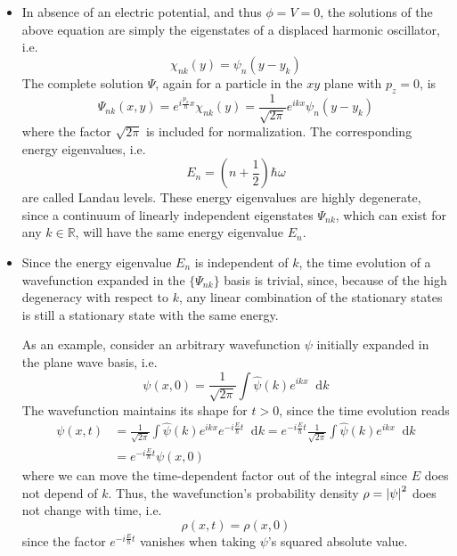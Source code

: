 \documentclass[11pt, a4paper]{article}
\newcommand{\diff}{\mathop{}\!\mathrm{d}} %
\newcommand{\F}[1]{\widehat{#1}} %
\newcommand{\p}{\psi}  %
\renewcommand{\P}{\Psi}  %
\begin{document}
\begin{itemize}
	\item In absence of an electric potential, and thus $ \phi = V = 0 $, the solutions of the above equation are simply the eigenstates of a displaced harmonic oscillator, i.e.
	\begin{equation*}
		\chi_{nk}(y) = \psi_{n}(y - y_{k})
	\end{equation*}
	The complete solution $ \Psi $, again for a particle in the $ xy $ plane with $ p_{z} = 0$, is
	\begin{equation*}
		\P_{nk}(x, y) = e^{i\frac{p_{x}}{\hbar}x}\chi_{nk}(y) = \frac{1}{\sqrt{2\pi}}e^{ikx} \psi_{n}(y - y_{k})
	\end{equation*}
	where the factor $ \sqrt{2\pi} $ is included for normalization. The corresponding energy eigenvalues, i.e.
	\begin{equation*}
		E_{n} = \left(n + \frac{1}{2}\right)\hbar \omega
	\end{equation*}
	are called Landau levels. These energy eigenvalues are highly degenerate, since a continuum of linearly independent eigenstates $ \P_{nk} $, which can exist for any $ k \in \mathbb{R} $, will have the same energy eigenvalue $ E_{n} $. 
	
	\item Since the energy eigenvalue $ E_{n} $ is independent of $ k $, the time evolution of a wavefunction expanded in the $ \{\P_{nk}\} $ basis is trivial, since, because of the high degeneracy with respect to $ k $, any linear combination of the stationary states is still a stationary state with the same energy.
	
	As an example, consider an arbitrary wavefunction $ \p $ initially expanded in the plane wave basis, i.e.
	\begin{equation*}
		\p(x, 0) = \frac{1}{\sqrt{2\pi}} \int \F{\p}(k)e^{ikx}\diff k
	\end{equation*}
	The wavefunction maintains its shape for $ t > 0 $, since the time evolution reads
	\begin{align*}
		\p(x, t) &= \frac{1}{\sqrt{2\pi}} \int \F{\p}(k)e^{ikx}e^{-i\frac{E}{\hbar}t} \diff k = e^{-i\frac{E}{\hbar}t} \frac{1}{\sqrt{2\pi}} \int \F{\p}(k)e^{ikx}\diff k\\
		& = e^{-i\frac{E}{\hbar}t} \p(x, 0)
	\end{align*}
	where we can move the time-dependent factor out of the integral since $ E $ does not depend of $ k $. Thus, the wavefunction's probability density $ \rho = \abs{\p}^{2} $ does not change with time, i.e.
	\begin{equation*}
		\rho(x, t) = \rho(x, 0)
	\end{equation*}
	since the factor $ e^{-i\frac{E}{\hbar}t} $ vanishes when taking $ \p $'s squared absolute value.
	

\end{itemize}
\end{document}
